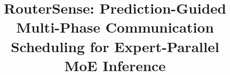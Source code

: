\documentclass[conference]{template/official/IEEEtran}
\title{RouterSense: Prediction-Guided Multi-Phase Communication Scheduling for Expert-Parallel MoE Inference}
\author{\IEEEauthorblockN{Anonymous Authors}}
\begin{document}
\maketitle

\begin{abstract}

\end{abstract}











\end{document}
